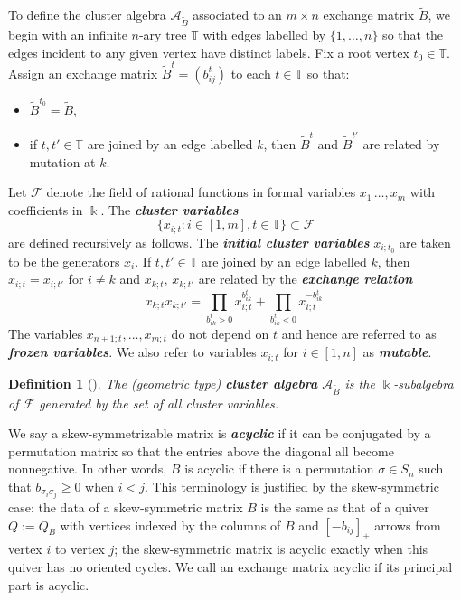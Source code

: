 \documentclass[12pt]{amsart}
\newcommand{\newword}[1]{\textbf{\emph{#1}}}
\newcommand{\cA}{\mathcal{A}}
\newcommand{\TT}{\mathbb{T}}
\newcommand{\kk}{\Bbbk}
\newcommand{\cF}{\mathcal{F}}
\newtheorem{definition}[theorem]{Definition}
\theoremstyle{remark}
\numberwithin{equation}{section}
\numberwithin{figure}{section}
\begin{document}
To define the cluster algebra $\cA_{\widetilde B}$ associated to an $m \times n$ exchange matrix $\widetilde B$, we begin with an infinite $n$-ary tree $\TT$ with edges labelled by $\{1,\dotsc,n\}$ so that the edges incident to any given vertex have distinct labels.
Fix a root vertex $t_0 \in\TT$.
Assign an exchange matrix $\widetilde B^t=(b_{ij}^t)$ to each $t \in\TT$ so that:
\begin{itemize}
  \item $\widetilde B^{t_0} = \widetilde B$,
  \item if $t, t' \in\TT$ are joined by an edge labelled $k$, then $\widetilde B^t$ and $\widetilde B^{t'}$ are related by mutation at $k$.
\end{itemize}

Let $\cF$ denote the field of rational functions in formal variables $x_{1}\,\dotsc,x_{m}$ with coefficients in $\kk$.
The \newword{cluster variables}
\[
  \big\{ x_{i;t}: i \in [1,m], t \in\TT\big\} \subset \cF
\]
are defined recursively as follows.
The \newword{initial cluster variables} $x_{i;t_0}$ are taken to be the generators $x_i$.
If $t,t' \in \TT$ are joined by an edge labelled $k$, then $x_{i;t} = x_{i;t'}$ for $i \neq k$ and $x_{k;t}$, $x_{k;t'}$ are related by the \newword{exchange relation}
\[
  x_{k;t}x_{k;t'}
  =
  \prod_{b^t_{ik}>0}x_{i;t}^{b^t_{ik}}
  +
  \prod_{b^t_{ik}<0}x_{i;t}^{-b^t_{ik}}.
\]
The variables $x_{n+1;t},\dotsc, x_{m;t}$ do not depend on $t$ and hence are referred to as \newword{frozen variables}.
We also refer to variables $x_{i;t}$ for $i\in[1,n]$ as \newword{mutable}.

\begin{definition}[\cite{FZ02}]
  The (geometric type) \newword{cluster algebra} $\cA_{\widetilde B}$ is the $\kk$-subalgebra of $\cF$ generated by the set of all cluster variables.
\end{definition}

We say a skew-symmetrizable matrix is \newword{acyclic} if it can be conjugated by a permutation matrix so that the entries above the diagonal all become nonnegative.
In other words, $B$ is acyclic if there is a permutation $\sigma \in S_n$ such that $b_{\sigma_i \sigma_j} \geq 0$ when $i < j$.
This terminology is justified by the skew-symmetric case: the data of a skew-symmetric matrix $B$ is the same as that of a quiver $Q := Q_B$ with vertices indexed by the columns of $B$ and $[-b_{ij}]_+$ arrows from vertex $i$ to vertex $j$; the skew-symmetric matrix is acyclic exactly when this quiver has no oriented cycles.
We call an exchange matrix acyclic if its principal part is acyclic.
\end{document}
